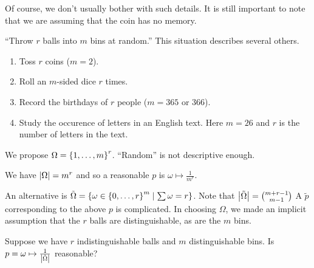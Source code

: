 \begin{examplelist}
        Of course, we don't usually bother with such details.
        It is still important to note that we are assuming that the coin has no
        memory.
    \item ``Throw $r$ balls into $m$ bins at random.''
        This situation describes several others.
        \begin{enumerate}
            \item Toss $r$ coins ($m = 2$).
            \item Roll an $m$-sided dice $r$ times.
            \item Record the birthdays of $r$ people ($m = 365$ or $366$).
            \item Study the occurence of letters in an English text.
                Here $m = 26$ and $r$ is the number of letters in the text.
        \end{enumerate}
        We propose $\Omega = \set{1, \dots, m}^{r}$.
        ``Random'' is not descriptive enough.

        We have $\abs{\Omega} = m^{r}$ and so a reasonable $p$ is
        $\omega \mapsto \frac{1}{m^{r}}$.

        An alternative is $\tilde{\Omega} =
        \set{\omega \in \set{0, \dots, r}^{m} \mid \sum \omega = r}$.
        Note that $\abs{\tilde{\Omega}} = \binom{m + r - 1}{m - 1}$
        A $\tilde{p}$ corresponding to the above $p$ is complicated.
        In choosing $\Omega$, we made an implicit assumption that the $r$ balls
        are distinguishable, as are the $m$ bins.

        Suppose we have $r$ indistinguishable balls and $m$ distinguishable
        bins.
        Is $p = \omega \mapsto \frac{1}{\abs{\tilde{\Omega}}}$ reasonable?
\end{examplelist}
